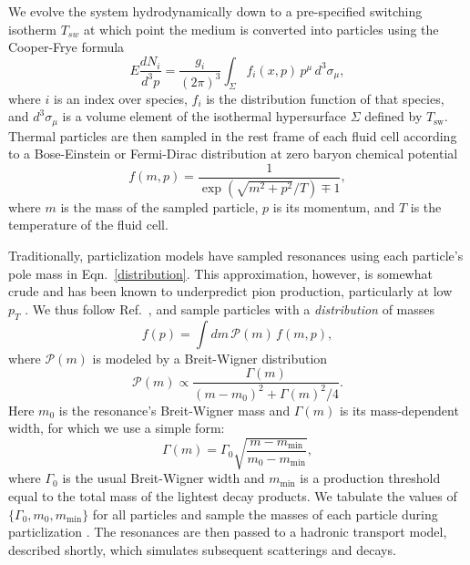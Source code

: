 \documentclass[aps,prc,reprint,amsmath,nofootinbib]{revtex4-1}
\begin{document}
We evolve the system hydrodynamically down to a pre-specified switching isotherm $T_{sw}$ at which point the medium is converted into particles using the Cooper-Frye formula \cite{PhysRevD.10.186}
\begin{equation}
  \label{cooper-frye}
  E \frac{dN_i}{d^3p} = \frac{g_i}{(2\pi)^3} \int_\Sigma f_i(x, p)\, p^\mu\, d^3\sigma_\mu,
\end{equation}
where $i$ is an index over species, $f_i$ is the distribution function of that species, and $d^3\sigma_\mu$ is a volume element of the isothermal hypersurface $\Sigma$ defined by $T_\mathrm{sw}$.
Thermal particles are then sampled in the rest frame of each fluid cell according to a Bose-Einstein or Fermi-Dirac distribution at zero baryon chemical potential
\begin{equation}
  \label{distribution}
  f(m, p) = \frac{1}{\exp(\sqrt{m^2 + p^2}/T) \mp 1},
\end{equation}
where $m$ is the mass of the sampled particle, $p$ is its momentum, and $T$ is the temperature of the fluid cell.

Traditionally, particlization models have sampled resonances using each particle's pole mass in Eqn.~\eqref{distribution}.
This approximation, however, is somewhat crude and has been known to underpredict pion production, particularly at low $p_T$ \cite{Sollfrank:1991xm, Huovinen:2016xxq, Vovchenko:2018fmh}.
We thus follow Ref.~\cite{Bernhard:2018hnz}, and sample particles with a \emph{distribution} of masses
\begin{equation}
  f(p) = \int dm\, \mathcal{P}(m)\, f(m, p),
\end{equation}
where $\mathcal{P}(m)$ is modeled by a Breit-Wigner distribution
\begin{equation}
  \mathcal{P}(m) \propto \frac{\Gamma(m)}{(m - m_0)^2 + \Gamma(m)^2/4}.
\end{equation}
Here $m_0$ is the resonance's Breit-Wigner mass and $\Gamma(m)$ is its mass-dependent width, for which we use a simple form:
\begin{equation}
  \Gamma(m) = \Gamma_0 \sqrt{\frac{m - m_\mathrm{min}}{m_0 - m_\mathrm{min}}},
\end{equation}
where $\Gamma_0$ is the usual Breit-Wigner width and $m_\mathrm{min}$ is a production threshold equal to the total mass of the lightest decay products.
We tabulate the values of $\{\Gamma_0, m_0, m_\mathrm{min}\}$ for all particles and sample the masses of each particle during particlization \cite{PDG:2017}.
The resonances are then passed to a hadronic transport model, described shortly, which simulates subsequent scatterings and decays.
\end{document}
